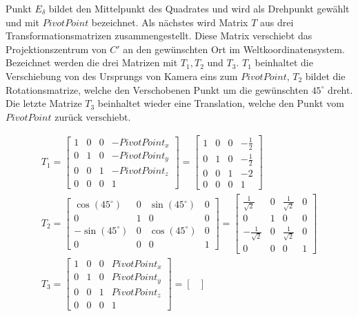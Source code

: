 Punkt $E_\delta$ bildet den Mittelpunkt des Quadrates und wird als Drehpunkt gewählt und mit $\textit{PivotPoint}$ bezeichnet. Als nächstes wird Matrix $T$ aus drei Transformationsmatrizen zusammengestellt. Diese Matrix verschiebt das Projektionszentrum von $C'$ an den gewünschten Ort im Weltkoordinatensystem. Bezeichnet werden die drei Matrizen mit $T_1, T_2$ und $T_3$. $T_1$ beinhaltet die Verschiebung von des Ursprungs von Kamera eins zum $\textit{PivotPoint}$, $T_2$ bildet die Rotationsmatrize, welche den Verschobenen Punkt um die gewünschten $45^\circ$ dreht. Die letzte Matrize $T_3$ beinhaltet wieder eine Translation, welche den Punkt vom $\textit{PivotPoint}$ zurück verschiebt. 

\begin{gather}
	T_1 = \begin{bmatrix}
		1&0&0&-\textit{PivotPoint}_x\\
		0&1&0&-\textit{PivotPoint}_y\\
		0&0&1&-\textit{PivotPoint}_z\\
		0&0&0&1
	\end{bmatrix} = 
	\begin{bmatrix}
		1&0&0&-\frac{1}{2}\\
		0&1&0&-\frac{1}{2}\\
		0&0&1&-2\\
		0&0&0&1
	\end{bmatrix}\\
	T_2 = \begin{bmatrix}
		\cos(45^\circ)&0&\sin(45^\circ)&0\\
		0&1&0&0\\
		-\sin(45^\circ)&0&\cos(45^\circ)&0\\
		0&0&0&1
	\end{bmatrix}=
	\begin{bmatrix}
		\frac{1}{\sqrt{2}}&0&\frac{1}{\sqrt{2}}&0\\
		0&1&0&0\\
		-\frac{1}{\sqrt{2}}&0&\frac{1}{\sqrt{2}}&0\\
		0&0&0&1
	\end{bmatrix}\\
	T_3 = 
	\begin{bmatrix}
		1&0&0&\textit{PivotPoint}_x\\
		0&1&0&\textit{PivotPoint}_y\\
		0&0&1&\textit{PivotPoint}_z\\
		0&0&0&1
	\end{bmatrix} = 
	\begin{bmatrix}

\end{bmatrix}
\end{gather}
